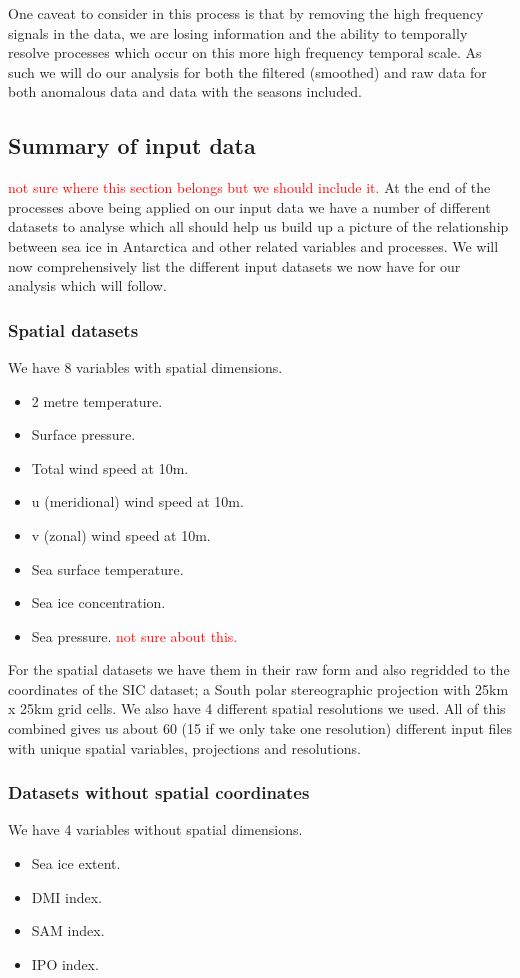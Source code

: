\documentclass[../main.tex]{subfiles}
\begin{document}
One caveat to consider in this process is that by removing the high frequency signals in the data, we are losing information and the ability to temporally resolve processes which occur on this more high frequency temporal scale. As such we will do our analysis for both the filtered (smoothed) and raw data for both anomalous data and data with the seasons included.



\subsection{Summary of input data}
\textcolor{red}{not sure where this section belongs but we should include it.}
At the end of the processes above being applied on our input data we have a number of different datasets to analyse which all should help us build up a picture of the relationship between sea ice in Antarctica and other related variables and processes. We will now comprehensively list the different input datasets we now have for our
analysis which will follow.

\subsubsection*{Spatial datasets}
We have 8 variables with spatial dimensions.
\begin{itemize}
    \item 2 metre temperature.
    \item Surface pressure.
    \item Total wind speed at 10m.
    \item u (meridional) wind speed at 10m.
    \item v (zonal) wind speed at 10m.
    \item Sea surface temperature.
    \item Sea ice concentration.
    \item Sea pressure. \textcolor{red}{not sure about this.}
\end{itemize}

For the spatial datasets we have them in their raw form and also regridded to the coordinates of the SIC dataset; a South polar stereographic projection with 25km x 25km grid cells.
We also have 4 different spatial resolutions we used.
All of this combined gives us about 60 (15 if we only take one resolution) different input files with unique spatial variables, projections and resolutions.

\subsubsection*{Datasets without spatial coordinates}
We have 4 variables without spatial dimensions.
\begin{itemize}
    \item Sea ice extent.
    \item DMI index.
    \item SAM index.
    \item IPO index.
\end{itemize}
\end{document}
